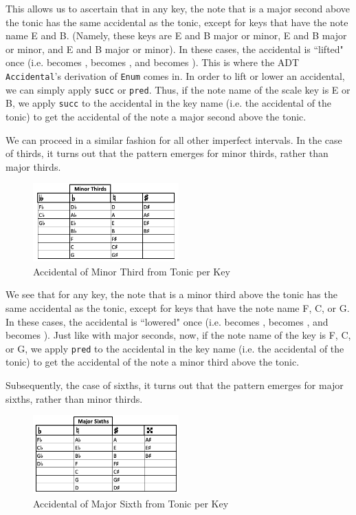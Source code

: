 \documentclass{report}
\begin{document}
This allows us to ascertain that in any key, the note that is a major second above the tonic has the same accidental as the tonic, except for keys that have the note name E and B. (Namely, these keys are E and B major or minor, E\musFlat\; and B\musFlat\; major or minor, and E\musSharp\; and B\musSharp\; major or minor). In these  cases, the accidental is ``lifted" once  (i.e. \musFlat\; becomes \musNatural, \musNatural\;  becomes \musSharp, and \musSharp\; becomes \musDoubleSharp). This is where the ADT \verb.Accidental.'s derivation of \verb.Enum. comes in. In order to lift or lower an accidental, we can simply apply \verb.succ. or \verb.pred.. Thus, if the note name of the scale key is E or B, we apply \verb.succ. to the accidental in the key name (i.e. the accidental of the tonic) to get the accidental of the note a major second above the tonic. 

We can proceed in a similar fashion for all other imperfect intervals. In the case of thirds, it turns out that the pattern emerges for minor thirds, rather than major thirds.
\newpage
\begin{figure}[h!]
\centering
\includegraphics[width=0.5\textwidth]{images/min_thirds}
\caption{Accidental of Minor Third from Tonic per Key}
\label{min_thirds}
\end{figure}

We see that for any key, the note that is a minor third above the tonic has the same accidental as the tonic, except for keys that have the note name F,  C, or G. In these  cases, the accidental is ``lowered" once  (i.e. \musFlat\; becomes \musDoubleFlat, \musNatural\; becomes \musFlat, and \musSharp\; becomes \musFlat). Just like with major seconds, now, if the note name of the key is F, C, or G, we apply \verb.pred. to the accidental in the key name (i.e. the accidental of the tonic) to get the accidental of the note a minor third above the tonic.

Subsequently, the case of sixths, it turns out that the pattern emerges for major sixths, rather than minor thirds.

\begin{figure}[h!]
\centering
\includegraphics[width=0.5\textwidth]{images/maj_sixths}
\caption{Accidental of Major Sixth from Tonic per Key}
\label{maj_sixths}
\end{figure}
\end{document}
